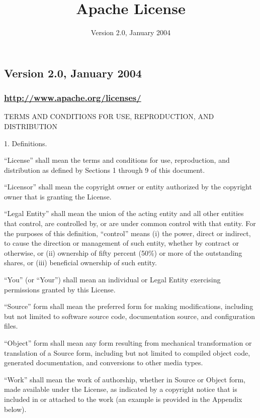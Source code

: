 \documentclass[]{article}
\title{Apache License}
\author{Version 2.0, January 2004}
\date{}
\begin{document}
\maketitle

\hypertarget{header}{}
\subsection{Version 2.0, January 2004}\label{version-2.0-january-2004}

\subsubsection{\texorpdfstring{\url{http://www.apache.org/licenses/}}{http://www.apache.org/licenses/}}\label{httpwww.apache.orglicenses}

TERMS AND CONDITIONS FOR USE, REPRODUCTION, AND DISTRIBUTION

1. Definitions.

``License'' shall mean the terms and conditions for use, reproduction,
and distribution as defined by Sections 1 through 9 of this document.

``Licensor'' shall mean the copyright owner or entity authorized by the
copyright owner that is granting the License.

``Legal Entity'' shall mean the union of the acting entity and all other
entities that control, are controlled by, or are under common control
with that entity. For the purposes of this definition, ``control'' means
(i) the power, direct or indirect, to cause the direction or management
of such entity, whether by contract or otherwise, or (ii) ownership of
fifty percent (50\%) or more of the outstanding shares, or (iii)
beneficial ownership of such entity.

``You'' (or ``Your'') shall mean an individual or Legal Entity
exercising permissions granted by this License.

``Source'' form shall mean the preferred form for making modifications,
including but not limited to software source code, documentation source,
and configuration files.

``Object'' form shall mean any form resulting from mechanical
transformation or translation of a Source form, including but not
limited to compiled object code, generated documentation, and
conversions to other media types.

``Work'' shall mean the work of authorship, whether in Source or Object
form, made available under the License, as indicated by a copyright
notice that is included in or attached to the work (an example is
provided in the Appendix below).
\end{document}
